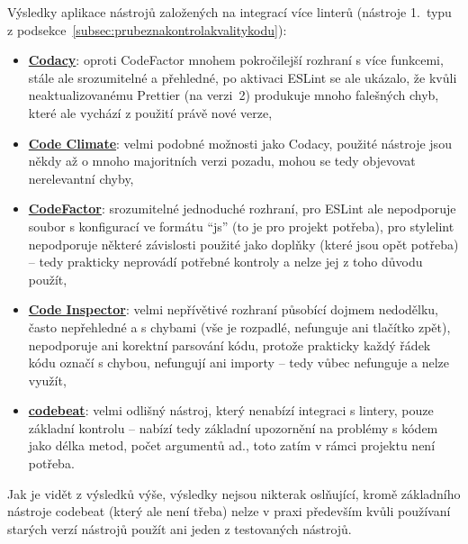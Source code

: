 Výsledky aplikace nástrojů založených na integrací více linterů (nástroje 1.~typu z podsekce~\ref{subsec:prubeznakontrolakvalitykodu}):
\begin{itemize}
    \item \href{https://www.codacy.com}{\textbf{Codacy}}: oproti CodeFactor mnohem pokročilejší rozhraní s více funkcemi, stále ale srozumitelné a přehledné, po aktivaci ESLint se ale ukázalo, že kvůli neaktualizovanému Prettier (na verzi~2) produkuje mnoho falešných chyb, které ale vychází z použití právě nové verze,
    \item \href{https://codeclimate.com}{\textbf{Code Climate}}: velmi podobné možnosti jako Codacy, použité nástroje jsou někdy až o mnoho majoritních verzi pozadu, mohou se tedy objevovat nerelevantní chyby,
    \item \href{https://www.codefactor.io}{\textbf{CodeFactor}}: srozumitelné jednoduché rozhraní, pro ESLint ale nepodporuje soubor s konfigurací ve formátu \enquote{js} (to je pro projekt potřeba), pro stylelint nepodporuje některé závislosti použité jako doplňky (které jsou opět potřeba) -- tedy prakticky neprovádí potřebné kontroly a nelze jej z toho důvodu použít,
    \item \href{https://www.code-inspector.com}{\textbf{Code Inspector}}: velmi nepřívětivé rozhraní působící dojmem nedodělku, často nepřehledné a s chybami (vše je rozpadlé, nefunguje ani tlačítko zpět), nepodporuje ani korektní parsování kódu, protože prakticky každý řádek kódu označí s chybou, nefungují ani importy -- tedy vůbec nefunguje a nelze využít,
    \item \href{https://codebeat.co}{\textbf{codebeat}}: velmi odlišný nástroj, který nenabízí integraci s lintery, pouze základní kontrolu -- nabízí tedy základní upozornění na problémy s kódem jako délka metod, počet argumentů ad., toto zatím v rámci projektu není potřeba.
\end{itemize}

Jak je vidět z výsledků výše, výsledky nejsou nikterak oslňující, kromě základního nástroje codebeat (který ale není třeba) nelze v praxi především kvůli používaní starých verzí nástrojů použít ani jeden z testovaných nástrojů.

